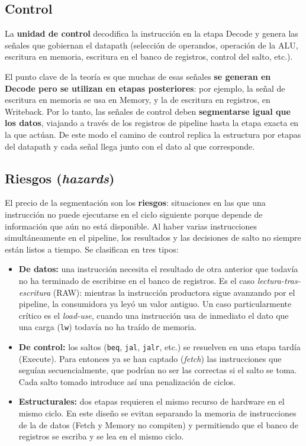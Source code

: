 \documentclass[11pt,a4paper]{article}
\begin{document}
\subsection{Control}

La \textbf{unidad de control} decodifica la instrucción en la etapa Decode y genera
las señales que gobiernan el datapath (selección de operandos, operación de la ALU,
escritura en memoria, escritura en el banco de registros, control del salto, etc.).

El punto clave de la teoría es que muchas de esas señales \textbf{se generan en
	Decode pero se utilizan en etapas posteriores}: por ejemplo, la señal de escritura en
memoria se usa en Memory, y la de escritura en registros, en Writeback. Por lo tanto,
las señales de control deben \textbf{segmentarse igual que los datos}, viajando a
través de los registros de pipeline hasta la etapa exacta en la que actúan. De este
modo el camino de control replica la estructura por etapas del datapath y cada señal
llega junto con el dato al que corresponde.

\subsection{Riesgos (\textit{hazards})}

El precio de la segmentación son los \textbf{riesgos}: situaciones en las que una
instrucción no puede ejecutarse en el ciclo siguiente porque depende de información
que aún no está disponible. Al haber varias instrucciones simultáneamente en el
pipeline, los resultados y las decisiones de salto no siempre están listos a tiempo.
Se clasifican en tres tipos:

\begin{itemize}
	\item \textbf{De datos:} una instrucción necesita el resultado de otra anterior que
	      todavía no ha terminado de escribirse en el banco de registros. Es el caso
	      \textit{lectura-tras-escritura} (RAW): mientras la instrucción productora
	      sigue avanzando por el pipeline, la consumidora ya leyó un valor antiguo. Un
	      caso particularmente crítico es el \textit{load-use}, cuando una instrucción
	      usa de inmediato el dato que una carga (\texttt{lw}) todavía no ha traído de
	      memoria.
	\item \textbf{De control:} los saltos (\texttt{beq}, \texttt{jal}, \texttt{jalr},
	      etc.) se resuelven en una etapa tardía (Execute). Para entonces ya se han
	      captado (\textit{fetch}) las instrucciones que seguían secuencialmente, que
	      podrían no ser las correctas si el salto se toma. Cada salto tomado introduce
	      así una penalización de ciclos.
	\item \textbf{Estructurales:} dos etapas requieren el mismo recurso de hardware en
	      el mismo ciclo. En este diseño se evitan separando la memoria de instrucciones
	      de la de datos (Fetch y Memory no compiten) y permitiendo que el banco de
	      registros se escriba y se lea en el mismo ciclo.
\end{itemize}
\end{document}
